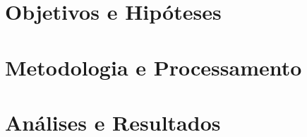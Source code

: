 \documentclass[
  12pt,
  openany,
  twoside,
  a4paper,
  english,
  brazil
]{abntex2}
\begin{document}
\part{Objetivos e Hipóteses}



\part{Metodologia e Processamento}



\part{Análises e Resultados}
 





\postextual







\end{document}
